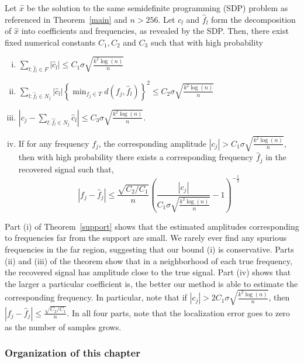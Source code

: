 \begin{theorem} \label{support} Let $\hat{x}$ be the solution to the same
semidefinite programming (SDP) problem as referenced in Theorem~\ref{main} and
$n > 256$. Let $\hat{c_l}$ and $\hat{f}_l$ form the decomposition of $\hat{x}$
into coefficients and frequencies, as revealed by the SDP. Then, there exist
fixed numerical constants $C_1,C_2$ and $C_3$ such that with high probability
\begin{enumerate}[i.)] \item $\sum_{l : \hat{f}_l \in F} |\hat{c}_l| \leq C_1
\sigma\sqrt{\frac{k^2 \log(n)}{n}}$ \item $\sum_{l : \hat{f}_l \in N_j}
|\hat{c}_l| \left\{ \min_{f_j \in T} d(f_j,\hat{f}_l) \right\}^2 \leq C_2
\sigma\sqrt{\frac{k^2 \log(n)}{n}}$ \item $\left| c_j - \sum_{l : \hat{f_l} \in
N_j} \hat{c}_l \right| \leq C_3 \sigma\sqrt{\frac{k^2 \log(n)}{n}}$. \item If
for any frequency $f_j$, the corresponding amplitude $|c_j| > C_1 \sigma
\sqrt{\frac{ k^2 \log(n)}{n}}$, then with high probability there exists a
corresponding frequency $\hat{f}_j$ in the recovered signal such that, \[ \left|
f_j - \hat{f}_j \right| \leq \frac{\sqrt{C_2/C_1}}{n}\left(\frac{|c_j|}{C_1
\sigma \sqrt{\frac{ k^2 \log(n)}{n}}} - 1\right)^{-\tfrac{1}{2}} \]
\end{enumerate} \end{theorem}

Part (i) of Theorem~\ref{support} shows that the estimated amplitudes
corresponding to frequencies far from the support are small. We rarely ever find
any spurious frequencies in the far region, suggesting that our bound (i) is
conservative. Parts (ii) and (iii) of the theorem show that in a neighborhood of
each true frequency, the recovered signal has amplitude close to the true
signal. Part (iv) shows that the larger a particular coefficient is, the better
our method is able to estimate the corresponding frequency. In particular, note
that if $|c_j| > 2 C_1 \sigma \sqrt{\frac{ k^2 \log(n)}{n}}$, then $\left| f_j -
\hat{f}_j \right| \leq \frac{\sqrt{C_2/C_1} }{n}$. In all four parts, note that
the localization error goes to zero as the number of samples grows.

\subsubsection{Organization of this chapter}

